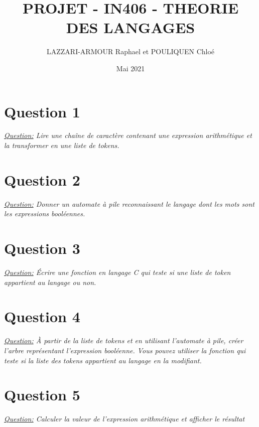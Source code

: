\documentclass{article}
\title{PROJET - IN406 - THEORIE DES LANGAGES}
\author{LAZZARI-ARMOUR Raphael et POULIQUEN Chloé}
\date{Mai 2021}
\begin{document}
\maketitle

\section{Question 1}
\textit{\underline{Question:} Lire une chaîne de caractère contenant une expression arithmétique et la transformer en une liste de tokens.} 


\section{Question 2}
\textit{\underline{Question:} Donner un automate à pile reconnaissant le langage dont les mots sont les expressions
booléennes.}

\section{Question 3}
\textit{\underline{Question:} Écrire une fonction en langage C qui teste si une liste de token appartient au langage ou non.}

\section{Question 4}
\textit{\underline{Question:} À partir de la liste de tokens et en utilisant l’automate à pile, créer l’arbre représentant l’expression booléenne. Vous pouvez utiliser la fonction qui teste si la liste des tokens appartient au langage en la modifiant.}

\section{Question 5}
\textit{\underline{Question:} Calculer la valeur de l’expression arithmétique et afficher le résultat}
\end{document}
